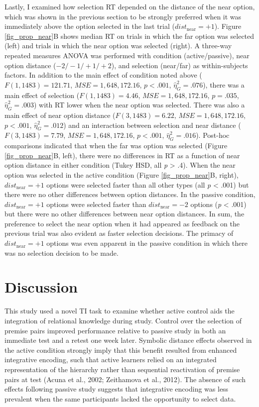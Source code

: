 \documentclass[floatsintext,man]{apa6}
\theoremstyle{definition}
\theoremstyle{definition}
\theoremstyle{definition}
\theoremstyle{remark}
\begin{document}
Lastly, I examined how selection RT depended on the distance of the near
option, which was shown in the previous section to be strongly preferred
when it was immediately above the option selected in the last trial
(\(dist_{\text{near}}=+1\)). Figure \ref{fig_prop_near}B shows median RT
on trials in which the far option was selected (left) and trials in
which the near option was selected (right). A three-way repeated
measures ANOVA was performed with condition (active/passive), near
option distance (\(-2/-1/+1/+2\)), and selection (near/far) as
within-subjects factors. In addition to the main effect of condition
noted above (\(F(1, 1483) = 121.71\), \(\mathit{MSE} = 1,648,172.16\),
\(p < .001\), \(\hat{\eta}^2_G = .076\)), there was a main effect of
selection (\(F(1, 1483) = 4.46\), \(\mathit{MSE} = 1,648,172.16\),
\(p = .035\), \(\hat{\eta}^2_G = .003\)) with RT lower when the near
option was selected. There was also a main effect of near option
distance (\(F(3, 1483) = 6.22\), \(\mathit{MSE} = 1,648,172.16\),
\(p < .001\), \(\hat{\eta}^2_G = .012\)) and an interaction between
selection and near distance (\(F(3, 1483) = 7.79\),
\(\mathit{MSE} = 1,648,172.16\), \(p < .001\),
\(\hat{\eta}^2_G = .016\)). Post-hoc comparisons indicated that when the
far was option was selected (Figure \ref{fig_prop_near}B, left), there
were no differences in RT as a function of near option distance in
either condition (Tukey HSD, all \emph{p} \textgreater{} .4). When the
near option was selected in the active condition (Figure
\ref{fig_prop_near}B, right), \(dist_{\text{near}}=+1\) options were
selected faster than all other types (all \emph{p} \textless{} .001) but
there were no other differences between option distances. In the passive
condition, \(dist_{\text{near}}=+1\) options were selected faster than
\(dist_{\text{near}}=-2\) options (\emph{p} \textless{} .001) but there
were no other differences between near option distances. In sum, the
preference to select the near option when it had appeared as feedback on
the previous trial was also evident as faster selection decisions. The
primacy of \(dist_{\text{near}}=+1\) options was even apparent in the
passive condition in which there was no selection decision to be made.

\section{Discussion}\label{discussion}

This study used a novel TI task to examine whether active control aids
the integration of relational knowledge during study. Control over the
selection of premise pairs improved performance relative to passive
study in both an immediate test and a retest one week later. Symbolic
distance effects observed in the active condition strongly imply that
this benefit resulted from enhanced integrative encoding, such that
active learners relied on an integrated representation of the hierarchy
rather than sequential reactivation of premise pairs at test (Acuna et
al., 2002; Zeithamova et al., 2012). The absence of such effects
following passive study suggests that integrative encoding was less
prevalent when the same participants lacked the opportunity to select
data.
\end{document}
